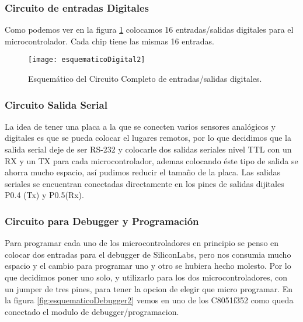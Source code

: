 
\subsubsection{Circuito de entradas Digitales}
\label{subsub:entradas_digitales}

Como podemos ver en la figura \ref{fig:esquematicoDigital2} colocamos 16 entradas/salidas digitales para el microcontrolador. Cada chip tiene las mismas 16 entradas.

\begin{figure}  [H]
\centering
  \texttt{[image: esquematicoDigital2]}
  \caption{Esquemático del Circuito Completo de entradas/salidas digitales.}\label{fig:esquematicoDigital2}
\end{figure}



\subsubsection{Circuito Salida Serial}
\label{subsub:salida_serial2}

La idea de tener una placa a la que se conecten varios sensores analógicos y digitales es que se pueda colocar el lugares remotos, por lo que decidimos que la salida serial deje de ser RS-232 y colocarle dos salidas seriales nivel TTL con un RX y un TX para cada microcontrolador, ademas colocando éste tipo de salida se ahorra mucho espacio, así pudimos reducir el tamaño de la placa. Las salidas seriales se encuentran conectadas directamente en los pines de salidas dijitales P0.4 (Tx) y P0.5(Rx).


\subsubsection{Circuito para Debugger y Programación} %
\label{subsub:debugger_programacion2}

Para programar cada uno de los microcontroladores en principio se penso en colocar dos entradas para el debugger de SiliconLabs, pero nos consumia mucho espacio y el cambio para programar uno y otro se hubiera hecho molesto. Por lo que decidimos poner uno solo, y utilizarlo para los dos microcontroladores, con un jumper de tres pines, para tener la opcion de elegir que micro programar.
En la figura \ref{fig:esquematicoDebugger2} vemos en uno de los C8051f352 como queda conectado el modulo de debugger/programacion.

